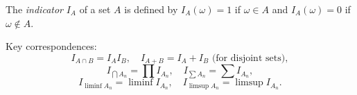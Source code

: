 The \textit{indicator} $I_A$ of a set $A$ is defined by $I_A(\omega) = 1$ if $\omega \in A$ and $I_A(\omega) = 0$ if $\omega \notin A$.

Key correspondences:
$$I_{A \cap B} = I_A I_B, \quad I_{A+B} = I_A + I_B \text{ (for disjoint sets)},$$
$$I_{\bigcap A_n} = \prod I_{A_n}, \quad I_{\sum A_n} = \sum I_{A_n},$$
$$I_{\liminf A_n} = \liminf I_{A_n}, \quad I_{\limsup A_n} = \limsup I_{A_n}.$$
